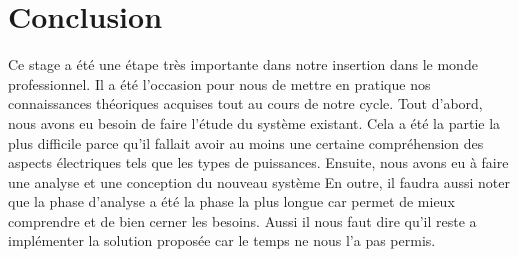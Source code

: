 \chapter*{Conclusion}

Ce stage a été une étape très importante dans notre insertion dans le monde professionnel. Il a été l’occasion pour nous de mettre en pratique nos connaissances théoriques acquises tout au cours de notre cycle.
Tout d’abord, nous avons eu besoin de faire l’étude du système existant. Cela a été la partie la plus difficile parce qu’il fallait avoir au moins une certaine compréhension des aspects électriques tels que les types de puissances. Ensuite, nous avons eu à faire une analyse et une conception du nouveau système 
En outre, il faudra aussi noter que la phase d’analyse a été la phase la plus longue car permet de mieux comprendre et de bien cerner les besoins. Aussi il nous faut dire qu’il reste a implémenter la solution proposée car le temps ne nous l’a pas permis.
